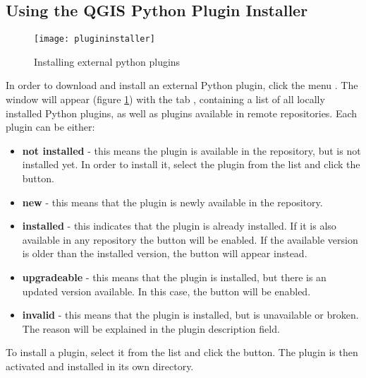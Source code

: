 \subsection{Using the QGIS Python Plugin Installer}\label{sec:python_plugin_installer}

\begin{figure}[ht]
   \centering
   \texttt{[image: plugininstaller]}
   \caption{Installing external python plugins \nixcaption}\label{fig:plugininstaller}\smallskip
\end{figure}

In order to download and install an external Python plugin, click the
menu  \arrow {}. The  window will appear
(figure \ref{fig:plugininstaller}) with the tab , containing
a list of all locally installed Python plugins, as well as plugins
available in remote repositories. Each plugin can be either:
\begin{itemize}[label=--]
\item \textbf{not installed} - this means the plugin is available in the repository, but is not installed yet. In order to install it, select the plugin from the list and click the  button.
\item \textbf{new} - this means that the plugin is newly available in the repository.
\item \textbf{installed} - this indicates that the plugin is already installed. If it is also available in any repository the  button will be enabled. If the available version is older than the installed version, the  button will appear instead.
\item \textbf{upgradeable} - this means that the plugin is installed, but there is an updated version available. In this case, the  button will be enabled.
\item \textbf{invalid} - this means that the plugin is installed, but is unavailable or broken. The reason will be explained in the plugin description field.
\end{itemize}


To install a plugin, select it from the list and click the 
button. The plugin is then activated and installed in its own directory.

